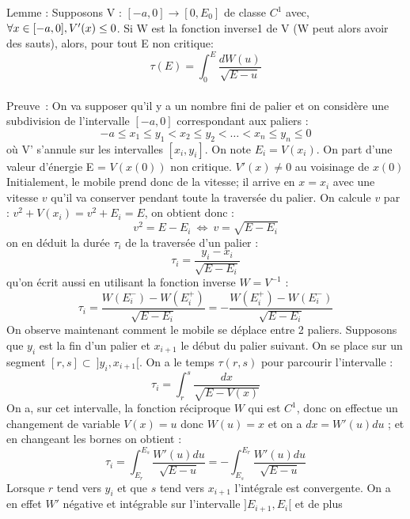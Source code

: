 \documentclass[french]{article}
\begin{document}
Lemme : Supposons V : $[-a,0] \to [0,E_0]$ de classe $C^1$ avec, $\forall  x \in [-a,0],\newline V'(x) \leq 0$. Si W est la fonction inverse1 de V (W peut alors avoir des sauts), alors, pour tout E non critique:\[ \tau(E) = \int_{0}^{E} \frac{dW(u)}{\sqrt{E-u}} \]
\\
Preuve~: On va supposer qu'il y a un nombre fini de palier et on considère une subdivision de l'intervalle $[-a,0]$ correspondant aux paliers : \[-a\leq x_1\leq y_1 < x_2 \leq y_2 < \ldots < x_n \leq y_n \leq 0 \]
où V' s'annule sur les intervalles $\left[x_i,y_i \right]$. On note $E_i = V(x_i)$. On part d’une valeur d’énergie E = $V(x(0))$ non critique. $V'(x)\neq 0$ au voisinage de $x(0)$
Initialement, le mobile prend donc de la vitesse; il arrive en $x=x_i$ avec une vitesse $v$ qu’il va conserver pendant toute la traversée du palier. On calcule $v$ par : $v^2 + V(x_i) = v^2 + E_i = E$, on obtient donc :
\[v^2=E-E_i~ \Leftrightarrow~v=\sqrt{E-E_i}\] on en déduit la durée $ \tau_i$ de la traversée d'un palier : \[\tau_i=\frac{y_i-x_i}{\sqrt{E-E_i}}\] qu'on écrit aussi en utilisant la fonction inverse $W=V^{-1}$ :
\[\tau_i=\frac{W(E_i^-)-W(E_i^+)}{\sqrt{E-E_i}}=-\frac{W(E_i^+)-W(E_i^-)}
{\sqrt{E-E_i}}\]
On observe maintenant comment le mobile se déplace entre 2 paliers. Supposons que $y_i$ est la fin d'un palier et $x_{i+1}$ le début du palier suivant. On se place sur un segment $[r,s] \subset~ ]y_i,x_{i+1}[$. On a le temps $\tau(r,s)$ pour parcourir l'intervalle :\[\tau_i=\int_{r}^{s} \frac{dx}{\sqrt{E-V(x)}}\]
On a, sur cet intervalle, la fonction réciproque $W$ qui est $C^1$, donc on effectue un changement de variable $V(x)=u$ donc $W(u)=x$ et on a $dx=W'(u)du$ ; et en changeant les bornes on obtient :\[\tau_i=\int_{E_r}^{E_s} \frac{W'(u)du}{\sqrt{E-u}} =-\int_{E_s}^{E_r} \frac{W'(u)du}{\sqrt{E-u}}\]
Lorsque $r$ tend vers $y_i$ et que $s$ tend vers $x_{i+1}$ l'intégrale est convergente. On a en effet $W'$ négative et intégrable sur l'intervalle $]E_{i+1},E_i[$ et de plus
\end{document}
